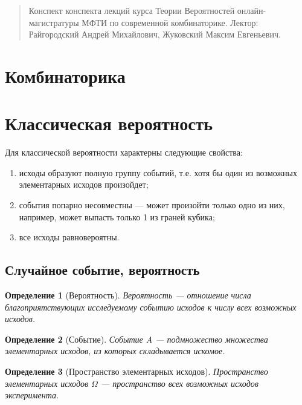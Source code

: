 \documentclass{article}
\theoremstyle{mydef}
\newtheorem{definition}{Определение}
\theoremstyle{myth}
\begin{document}
\begin{abstract}
    Конспект конспекта лекций курса Теории Вероятностей онлайн-магистратуры МФТИ по современной комбинаторике. \newline
    Лектор: Райгородский Андрей Михайлович, Жуковский Максим Евгеньевич.
\end{abstract}

\tableofcontents
 
\newpage

\section{Комбинаторика}

\section{Классическая вероятность}

Для классической вероятности характерны следующие свойства:
\begin{enumerate}
    \item исходы образуют полную группу событий, т.е. хотя бы один из возможных элементарных исходов произойдет;
    \item события попарно несовместны --- может произойти только одно из них, например, может выпасть только 1 из граней кубика;
    \item все исходы равновероятны.
\end{enumerate}

\subsection{Случайное событие, вероятность}

\begin{definition}[Вероятность]
    Вероятность --- отношение числа благоприятствующих исследуемому событию исходов к числу всех возможных исходов.
\end{definition}

\begin{definition}[Событие]
    Событие A --- подмножество множества элементарных исходов, из которых складывается искомое.
\end{definition}

\begin{definition}[Пространство элементарных исходов]
    Пространство элементарных исходов $\Omega$ --- пространство всех возможных исходов эксперимента.
\end{definition}
\end{document}
